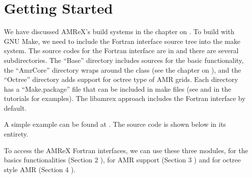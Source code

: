 \documentclass[letterpaper,10pt,english]{sphinxmanual}
\begin{document}
\section{Getting Started}
\label{\detokenize{Fortran:getting-started}}\label{\detokenize{Fortran::doc}}
\sphinxAtStartPar
We have discussed AMReX’s build systems in the chapter on
{\hyperref[\detokenize{BuildingAMReX_Chapter:chap-buildingamrex}]{}}.  To build with GNU Make, we need to include the
Fortran interface source tree into the make system. The source codes for the
Fortran interface are in  and there are several
sub\sphinxhyphen{}directories. The “Base” directory includes sources for the basic
functionality, the “AmrCore” directory wraps around the  class
(see the chapter on {\hyperref[\detokenize{AmrCore_Chapter:chap-amrcore}]{}}), and the “Octree” directory adds
support for octree type of AMR grids. Each directory has a “Make.package” file
that can be included in make files (see  and
 in the tutorials for examples). The libamrex approach includes the
Fortran interface by default.

\sphinxAtStartPar
A simple example can be found at . The source code
is shown below in its entirety.

\begin{sphinxVerbatim}[commandchars=\\\{\}]
    
  
\end{sphinxVerbatim}

\sphinxAtStartPar
To access the AMReX Fortran interfaces, we can use these three
modules,  for the basics functionalities
(Section 2 {\hyperref[\detokenize{Fortran:the-basics}]{}}),  for AMR
support (Section 3 {\hyperref[\detokenize{Fortran:amr-core-infrastructure}]{}}) and 
for octree style AMR (Section 4 {\hyperref[\detokenize{Fortran:octree}]{}}).
\end{document}
